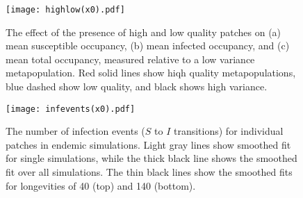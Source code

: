 \documentclass{svjour3}
\begin{document}
\begin{figure}
\centering
\texttt{[image: highlow(x0).pdf]}
\caption{The effect of the presence of high and low quality patches on (a) mean susceptible occupancy, (b) mean infected occupancy, and (c) mean total occupancy, measured relative to  a low variance metapopulation.  Red solid lines show hiqh quality metapopulations, blue dashed show low quality, and black shows high variance.}
\label{sens_x0}
\end{figure}

\begin{figure}
\centering
\texttt{[image: infevents(x0).pdf]}
\caption{The number of infection events ($S$ to $I$ transitions) for individual patches in endemic simulations.  Light gray lines show smoothed fit for single simulations, while the thick black line shows the smoothed fit over all simulations.  The thin black lines show the smoothed fits for longevities of 40 (top) and 140 (bottom).}
\label{infections_x0}
\end{figure}

\clearpage

     
\end{document}
